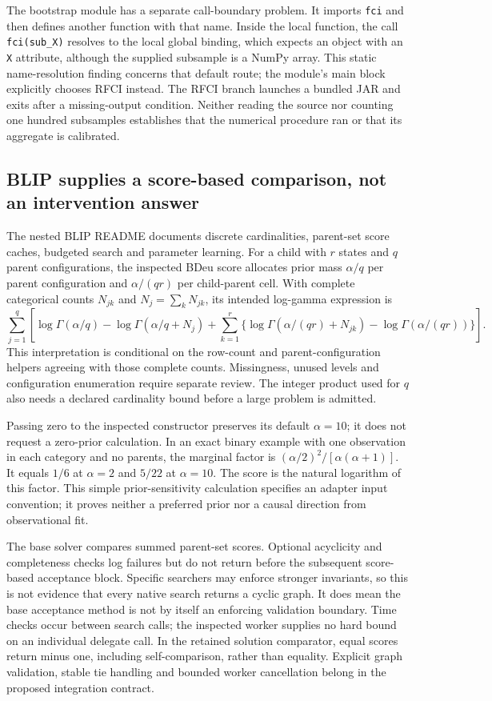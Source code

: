The bootstrap module has a separate call-boundary problem. It imports
\texttt{fci} and then defines another function with that name. Inside the local
function, the call \texttt{fci(sub\_X)} resolves to the local global binding,
which expects an object with an \texttt{X} attribute, although the supplied
subsample is a NumPy array. This static name-resolution finding concerns that
default route; the module's main block explicitly chooses RFCI instead. The
RFCI branch launches a bundled JAR and exits after a missing-output condition.
Neither reading the source nor counting one hundred subsamples establishes
that the numerical procedure ran or that its aggregate is calibrated.
\citep{exec28_nested_sources}

\subsection{BLIP supplies a score-based comparison, not an intervention answer}
The nested BLIP README documents discrete cardinalities, parent-set score
caches, budgeted search and parameter learning. For a child with $r$ states
and $q$ parent configurations, the inspected BDeu score allocates prior mass
$\alpha/q$ per parent configuration and $\alpha/(qr)$ per child-parent cell.
With complete categorical counts $N_{jk}$ and $N_j=\sum_kN_{jk}$, its intended
log-gamma expression is
\[
 \sum_{j=1}^{q}\left[\log\Gamma(\alpha/q)-\log\Gamma(\alpha/q+N_j)
 +\sum_{k=1}^{r}\{\log\Gamma(\alpha/(qr)+N_{jk})-\log\Gamma(\alpha/(qr))\}\right].
\]
This interpretation is conditional on the row-count and parent-configuration
helpers agreeing with those complete counts. Missingness, unused levels and
configuration enumeration require separate review. The integer product used
for $q$ also needs a declared cardinality bound before a large problem is
admitted.~\citep{exec28_nested_sources}

Passing zero to the inspected constructor preserves its default $\alpha=10$;
it does not request a zero-prior calculation. In an exact binary example with
one observation in each category and no parents, the marginal factor is
$(\alpha/2)^2/[\alpha(\alpha+1)]$. It equals $1/6$ at $\alpha=2$ and $5/22$
at $\alpha=10$. The score is the natural logarithm of this factor. This simple
prior-sensitivity calculation specifies an adapter input convention; it proves
neither a preferred prior nor a causal direction from observational fit.
\citep{exec28_nested_reference}

The base solver compares summed parent-set scores. Optional acyclicity and
completeness checks log failures but do not return before the subsequent
score-based acceptance block. Specific searchers may enforce stronger
invariants, so this is not evidence that every native search returns a cyclic
graph. It does mean the base acceptance method is not by itself an enforcing
validation boundary. Time checks occur between search calls; the inspected
worker supplies no hard bound on an individual delegate call. In the retained
solution comparator, equal scores return minus one, including self-comparison,
rather than equality. Explicit graph validation, stable tie handling and
bounded worker cancellation belong in the proposed integration contract.
\citep{exec28_nested_sources,exec28_nested_reference}

